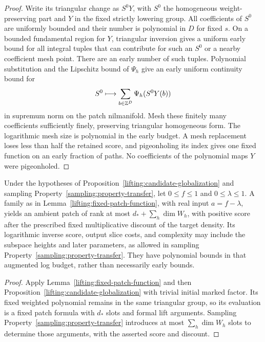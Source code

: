 \begin{proof}
Write its triangular change as $S^0Y$, with $S^0$ the homogeneous
weight-preserving part and $Y$ in the fixed strictly lowering group.
All coefficients of $S^0$ are uniformly bounded and their number is
polynomial in $D$ for fixed $s$.  On a bounded fundamental region for
$Y$, triangular inversion gives a uniform early bound for all
integral tuples that can contribute for such an $S^0$ or a nearby
coefficient mesh point.  There are an early number of such tuples.
Polynomial substitution and the Lipschitz bound of $\Psi_h$ give an
early uniform continuity bound for
\[
          S^0\longmapsto
          \sum_{b\in\mathbb Z^D}\Psi_h(S^0Y(b))
\]
in supremum norm on the patch nilmanifold.  Mesh these finitely many
coefficients sufficiently finely, preserving triangular homogeneous
form.  The logarithmic mesh size is polynomial in the early budget.
A mesh replacement loses less than half the retained score, and
pigeonholing its index gives one fixed function on an early fraction
of paths.  No coefficients of the polynomial maps $Y$ were
pigeonholed.
\end{proof}

\begin{corollary}
\label{lifting:globalize-patches}
Under the hypotheses of Proposition~\ref{lifting:candidate-globalization}
and sampling Property~\ref{sampling:property-transfer}, let
$0\le f\le1$ and $0\le\lambda\le1$.
A family as in Lemma~\ref{lifting:fixed-patch-function}, with real
input $a=f-\lambda$, yields an ambient patch of
rank at most $d_*+\sum_h\dim W_h$, with positive score after
the prescribed fixed multiplicative discount of the target density.
Its logarithmic inverse score, output slice costs, and complexity
may include the subspace heights and later parameters, as allowed
in sampling Property~\ref{sampling:property-transfer}.  They have polynomial bounds in that
augmented log budget, rather than necessarily early bounds.
\end{corollary}

\begin{proof}
Apply Lemma~\ref{lifting:fixed-patch-function} and then
Proposition~\ref{lifting:candidate-globalization} with trivial
initial marked factor.  Its fixed weighted polynomial remains in
the same triangular group, so its evaluation is a fixed patch
formula with $d_*$ slots and formal lift arguments.
Sampling Property~\ref{sampling:property-transfer} introduces at most $\sum_h\dim W_h$ slots to
determine those arguments, with the asserted score and discount.
\end{proof}

